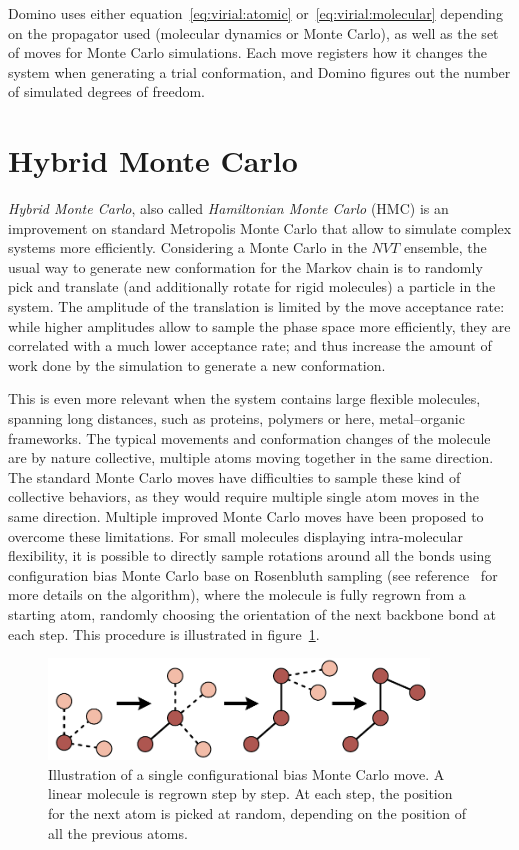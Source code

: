 \documentclass[thesis]{subfiles}
\begin{document}
Domino uses either equation~\eqref{eq:virial:atomic}
or~\eqref{eq:virial:molecular} depending on the propagator used (molecular
dynamics or Monte Carlo), as well as the set of moves for Monte Carlo
simulations. Each move registers how it changes the system when generating a
trial conformation, and Domino figures out the number of simulated degrees of
freedom.

\newpage
\section{Hybrid Monte Carlo}
\label{sec:hmc}

\emph{Hybrid Monte Carlo}, also called \emph{Hamiltonian Monte Carlo} (HMC) is
an improvement on standard Metropolis Monte Carlo that allow to simulate complex
systems more efficiently. Considering a Monte Carlo in the $NVT$ ensemble, the
usual way to generate new conformation for the Markov chain is to randomly pick
and translate (and additionally rotate for rigid molecules) a particle in the
system. The amplitude of the translation is limited by the move acceptance rate:
while higher amplitudes allow to sample the phase space more efficiently, they
are correlated with a much lower acceptance rate; and thus increase the amount
of work done by the simulation to generate a new conformation.

This is even more relevant when the system contains large flexible molecules,
spanning long distances, such as proteins, polymers or here, metal--organic
frameworks. The typical movements and conformation changes of the molecule are
by nature collective, multiple atoms moving together in the same direction. The
standard Monte Carlo moves have difficulties to sample these kind of collective
behaviors, as they would require multiple single atom moves in the same
direction. Multiple improved Monte Carlo moves have been proposed to overcome
these limitations. For small molecules displaying intra-molecular flexibility,
it is possible to directly sample rotations around all the bonds using
configuration bias Monte Carlo base on Rosenbluth sampling (see
reference~\cite{Frenkel2002} for more details on the algorithm), where the
molecule is fully regrown from a starting atom, randomly choosing the
orientation of the next backbone bond at each step.  This procedure is
illustrated in figure~\ref{fig:cbmc}.

\begin{figure}[ht]
    \centering
    \includegraphics[width=0.9\textwidth]{figures/images/cbmc}
    \caption{Illustration of a single configurational bias Monte Carlo move. A
    linear molecule is regrown step by step. At each step, the position for the
    next atom is picked at random, depending on the position of all the
    previous atoms.}
    \label{fig:cbmc}
\end{figure}
\end{document}
